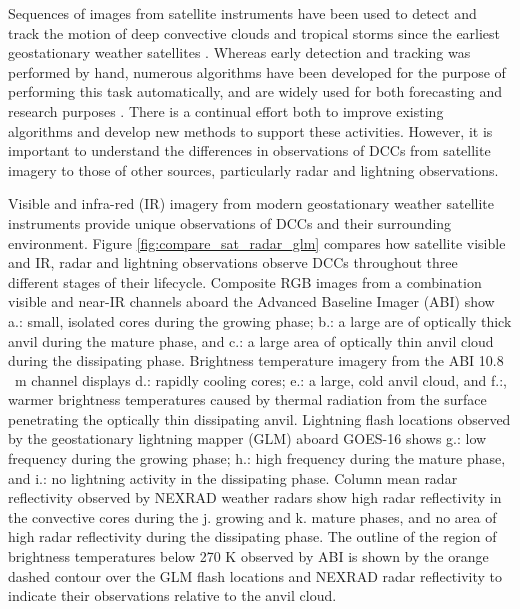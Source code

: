 \documentclass[amt, manuscript]{copernicus}
\begin{document}
Sequences of images from satellite instruments have been used to detect and track the motion of deep convective clouds and tropical storms since the earliest geostationary weather satellites \citep{menzel_cloud_2001}.
Whereas early detection and tracking was performed by hand, numerous algorithms have been developed for the purpose of performing this task automatically, and are widely used for both forecasting and research purposes \citep[e.g.][]{mecikalski_use_2011, senf_characterization_2015, senf_satellite-based_2017, feng_life_2012, feng_spatiotemporal_2019, zinner_cb-tram:_2008}.
There is a continual effort both to improve existing algorithms and develop new methods to support these activities.
However, it is important to understand the differences in observations of DCCs from satellite imagery to those of other sources, particularly radar and lightning observations.

Visible and infra-red (IR) imagery from modern geostationary weather satellite instruments provide unique observations of DCCs and their surrounding environment.
Figure \ref{fig:compare_sat_radar_glm} compares how satellite visible and IR, radar and lightning observations observe DCCs throughout three different stages of their lifecycle.
Composite RGB images from a combination visible and near-IR channels aboard the Advanced Baseline Imager (ABI) show a.: small, isolated cores during the growing phase; b.: a large are of optically thick anvil during the mature phase, and c.: a large area of optically thin anvil cloud during the dissipating phase.
Brightness temperature imagery from the ABI 10.8 \unit{\mu m} channel displays d.: rapidly cooling cores; e.: a large, cold anvil cloud, and f.:, warmer brightness temperatures caused by thermal radiation from the surface penetrating the optically thin dissipating anvil. 
Lightning flash locations observed by the geostationary lightning mapper (GLM) aboard GOES-16 shows g.: low frequency during the growing phase; h.: high frequency during the mature phase, and i.: no lightning activity in the dissipating phase. 
Column mean radar reflectivity observed by NEXRAD weather radars show high radar reflectivity in the convective cores during the j. growing and k. mature phases, and no area of high radar reflectivity during the dissipating phase. 
The outline of the region of brightness temperatures below 270 \unit{K} observed by ABI is shown by the orange dashed contour over the GLM flash locations and NEXRAD radar reflectivity to indicate their observations relative to the anvil cloud.
\end{document}
